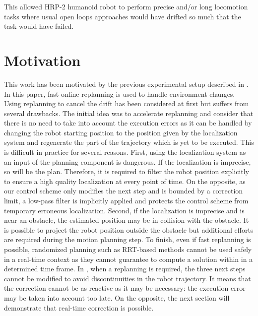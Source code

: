 This allowed HRP-2 humanoid robot to perform precise and/or long
locomotion tasks where usual open loops approaches would have drifted
so much that the task would have failed.


\section{Motivation}


This work has been motivated by the previous experimental setup
described in \cite{11humanoids.baudouin}. In this paper, fast online
replanning is used to handle environment changes. Using replanning to
cancel the drift has been considered at first but suffers from several
drawbacks. The initial idea was to accelerate replanning and consider
that there is no need to take into account the execution errors as it
can be handled by changing the robot starting position to the position
given by the localization system and regenerate the part of the
trajectory which is yet to be executed. This is difficult in practice
for several reasons. First, using the localization system as an input
of the planning component is dangerous. If the localization is
imprecise, so will be the plan. Therefore, it is required to filter
the robot position explicitly to ensure a high quality localization at
every point of time. On the opposite, as our control scheme only
modifies the next step and is bounded by a correction limit, a
low-pass filter is implicitly applied and protects the control scheme
from temporary erroneous localization. Second, if the localization is
imprecise and is near an obstacle, the estimated position may be in
collision with the obstacle. It is possible to project the robot
position outside the obstacle but additional efforts are required
during the motion planning step. To finish, even if fast replanning is
possible, randomized planning such as RRT-based methods cannot be used
safely in a real-time context as they cannot guarantee to compute a
solution within in a determined time frame. In
\cite{11humanoids.baudouin}, when a replanning is required, the three
next steps cannot be modified to avoid discontinuities in the robot
trajectory. It means that the correction cannot be as reactive as it
may be necessary: the execution error may be taken into account too
late. On the opposite, the next section will demonstrate that
real-time correction is possible.


